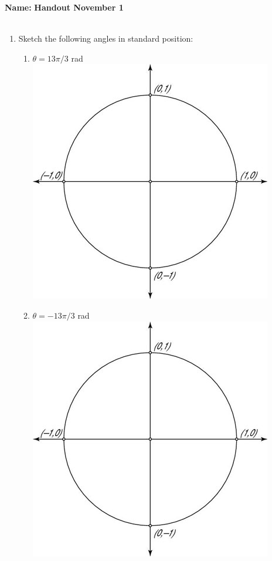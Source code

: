 \documentclass{article}
\begin{document}
\noindent \textbf{Name:}\underline{\hspace{2in}} \hfill \textbf{Handout November 1}
\\ \\

\begin{enumerate}
\item Sketch the following angles in standard position:
  \begin{multicols}{2}
    \begin{enumerate}
    \item $\theta = 13 \pi / 3$ rad \\ \includegraphics[scale=0.4]{circle.jpg}
    \item $\theta = -13 \pi / 3$ rad\\ \includegraphics[scale=0.4]{circle.jpg}

\end{enumerate}
\end{multicols}
\end{enumerate}
\end{document}
